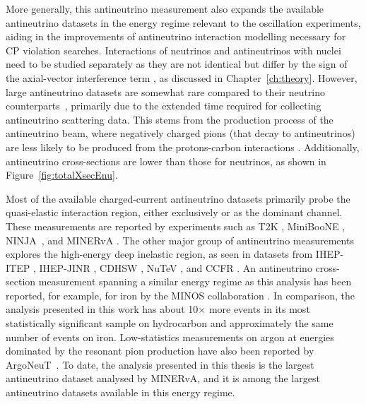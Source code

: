 More generally, this antineutrino measurement also expands the available antineutrino datasets in the energy regime relevant to the oscillation experiments, aiding in the improvements of antineutrino interaction modelling necessary for CP violation searches. Interactions of neutrinos and antineutrinos with nuclei need to be studied separately as they are not identical but differ by the sign of the axial-vector interference term \cite{PhysRevC.91.035501}, as discussed in Chapter~\ref{ch:theory}. However, large antineutrino datasets are somewhat rare compared to their neutrino counterparts~\cite{Workman:2022ynf}, primarily due to the extended time required for collecting antineutrino scattering data. This stems from the production process of the antineutrino beam, where negatively charged pions (that decay to antineutrinos) are less likely to be produced from the protons-carbon interactions \cite{numi2016_ADAMSON2016279}. Additionally, antineutrino cross-sections are lower than those for neutrinos, as shown in Figure~\ref{fig:totalXsecEnu}.

Most of the available charged-current antineutrino datasets primarily probe the quasi-elastic interaction region, either exclusively or as the dominant channel. These measurements are reported by experiments such as T2K \cite{Abe_2021, Abe_2020, Abe2_2020}, MiniBooNE \cite{Aguilar_Arevalo_2013}, NINJA~\cite{PhysRevD.102.072006}, and MINERvA \cite{PhysRevD.108.032018}. The other major group of antineutrino measurements explores the high-energy deep inelastic region, as seen in datasets from IHEP-ITEP \cite{Mukhin:1979bd}, IHEP-JINR \cite{Anikeev:1995dj}, CDHSW \cite{cdhsw}, NuTeV \cite{nutev_PhysRevD.74.012008}, and CCFR \cite{ccfr}. An antineutrino cross-section measurement spanning a similar energy regime as this analysis has been reported, for example, for iron by the MINOS collaboration \cite{PhysRevD.81.072002}. In comparison, the analysis presented in this work has about 10$\times$ more events in its most statistically significant sample on hydrocarbon and approximately the same number of events on iron. Low-statistics measurements on argon at energies dominated by the resonant pion production have also been reported by ArgoNeuT~\cite{PhysRevD.89.112003, PhysRevD.98.052002}. To date, the analysis presented in this thesis is the largest antineutrino dataset analysed by MINERvA, and it is among the largest antineutrino datasets available in this energy regime. 


